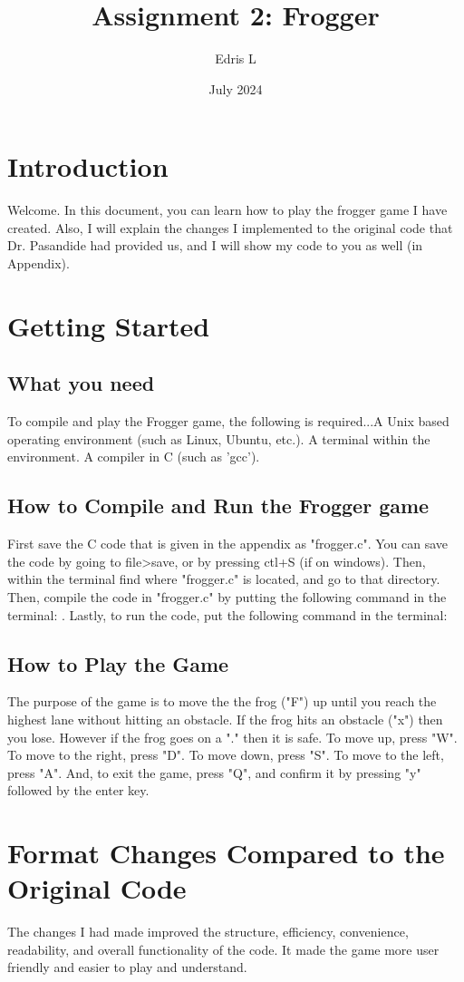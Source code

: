 \documentclass{article}
\title{Assignment 2: Frogger}
\author{Edris L}
\date{July 2024}
\begin{document}
\maketitle

\section{Introduction}
Welcome. In this document, you can learn how to play the frogger game I have created. Also, I will explain the changes I implemented to the original code that Dr. Pasandide had provided us, and I will show my code to you as well (in Appendix).
\section{Getting Started}
\subsection{What you need}
To compile and play the Frogger game, the following is required...A Unix based operating environment (such as Linux, Ubuntu, etc.). A terminal within the environment. A compiler in C (such as 'gcc').
\subsection{How to Compile and Run the Frogger game}
First save the C code that is given in the appendix as "frogger.c". You can save the code by going to file>save, or by pressing ctl+S (if on windows).
Then, within the terminal find where "frogger.c" is located, and go to that directory. Then, compile the code in "frogger.c" by putting the following command in the terminal:  . Lastly, to run the code, put the following command in the terminal: 
\subsection{How to Play the Game}
The purpose of the game is to move the the frog ("F") up until you reach the highest lane without hitting an obstacle. If the frog hits an obstacle ("x") then you lose. However if the frog goes on a "." then it is safe. To move up, press "W". To move to the right, press "D". To move down, press "S". To move to the left, press "A". And, to exit the game, press "Q", and confirm it by pressing "y" followed by the enter key.
\section{Format Changes Compared to the Original Code}
The changes I had made improved the structure, efficiency, convenience, readability, and overall functionality of the code. It made the game more user friendly and easier to play and understand.
\end{document}
